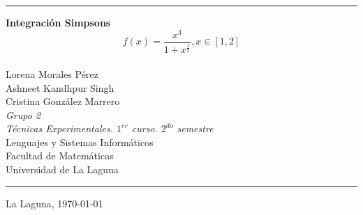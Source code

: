 \documentclass[spanish,a4paper,11pt]{report}
\begin{document}
\pagestyle{empty}
\thispagestyle{empty}


\newcommand{\HRule}{\rule{\linewidth}{1mm}}
\setlength{\parindent}{0mm}
\setlength{\parskip}{0mm}

\begin{center}
\end{center}

\HRule
\begin{center}
        {\Huge \bf Integración Simpsons} \\[2.5mm] 
        {\Huge \Large \[f(x) = \frac{x^3}{1+x^\frac{1}{2}}, x \in [1,2]\]} \\[2.5mm]
        {\Large Lorena Morales Pérez\\[2mm]
                Ashneet Kandhpur Singh\\[2mm]
                Cristina González Marrero}\\[5mm]
        {\Large \textit{Grupo 2 }} \\[5mm]


        {\em Técnicas Experimentales. $1^{er}$ curso. $2^{do}$ semestre} \\[5mm]
        Lenguajes y Sistemas Informáticos \\[5mm]
        Facultad de Matemáticas \\[5mm]
        
        Universidad de La Laguna \\
\end{center}
\HRule
{}
\begin{center}
  La Laguna, \today 
\end{center}


\newpage

\begin{abstract}

\parindent=1cm Sabemos que una integral definida se define geométricamente como el área bajo la curva f(x) en el intervalo[a,b].
Desafortunadamente en la mayoría de los casos prácticos es muy difícil hallar una antiderivada de f(x).
En estos casos el valor de la integraldebe de aproximarse. Existen varias maneras para ello, por modelos ó métodosnuméricos,
aplicar la regla Trapezoidal o Rectangular con segmentos cada vez más pequeños,o por otro lado, utilizar las Reglas de SIMPSON aplicando polinomios de orden superior
para conectar los puntos, con la cual se obtiene una estimación más exacta de una integral. Por ejemplo si hay un punto medio extra entre f(a) y f(b),
entonces se puede conectar los tres puntos con una parábola.
Dicho de otra manera, para cada aplicación de la regla de SIMPSON serequieren dos subintervalos, a fin de aplicarla n número de veces,
deberá dividirse el intervalo (a,b) en un número de subintervalos o segmentos. Cada subintervalo sucesivo se aproxima por un polinomio de segundo grado(parábola)
y se integra de tal manera que la suma de las áreas de cada segmentode la parábola sea la aproximación a la integración deseada.

\end{abstract}
\end{document}
